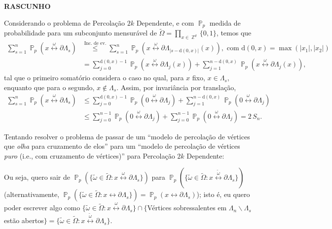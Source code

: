 \documentclass[12pt, a4paper]{article}
\DeclareMathOperator{\PX}{\mathbb{P}} %
\DeclareMathOperator{\ZX}{\mathbb{Z}} %
\theoremstyle{definition} %
\begin{document}
	\begin{center}
		\LARGE
		\textbf{RASCUNHO}
	\end{center} 
	
	Considerando o problema de Percolação $2k$ Dependente, e com $\PX_p$ medida de probabilidade para um subconjunto mensurável de $\tilde{\Omega} = \prod_{x \in \ZX^d}\{0, 1\}$, temos que
	\begin{align*}
	\sum_{s = 1}^{n} \PX_p(x \overset{\omega}{\leftrightarrow} \partial\Lambda_s) &\overset{\text{Inc. de ev.}}{\leq} \sum_{s = 1}^{n} \PX_p(x \overset{\omega}{\leftrightarrow} \partial\Lambda_{|s - \text{d}(0, x)|}(x)), \text{ com } \text{d}(0, x) = \max(|x_1|, |x_2|) \\
	&= \sum_{j = 0}^{\text{d}(0, x) - 1} \PX_p(x \overset{\omega}{\leftrightarrow} \partial\Lambda_j(x)) + \sum_{j = 1}^{n - \text{d}(0, x)} \PX_p(x \overset{\omega}{\leftrightarrow} \partial\Lambda_j(x)),
	\end{align*}
	tal que o primeiro somatório considera o caso no qual, para $x$ fixo, $x \in \Lambda_s$, enquanto que para o segundo, $x \not\in \Lambda_s$. Assim, por invariância por translação,
	\begin{align*}
		\sum_{s = 1}^{n} \PX_p(x \overset{\omega}{\leftrightarrow} \partial\Lambda_s) &\leq \sum_{j = 0}^{\text{d}(0, x) - 1} \PX_p(0 \overset{\omega}{\leftrightarrow} \partial\Lambda_j) + \sum_{j = 1}^{n - \text{d}(0, x)} \PX_p(0 \overset{\omega}{\leftrightarrow} \partial\Lambda_j) \\
		&\leq \sum_{j = 0}^{n - 1} \PX_p(0 \overset{\omega}{\leftrightarrow} \partial\Lambda_j) + \sum_{j = 0}^{n - 1} \PX_p(0 \overset{\omega}{\leftrightarrow} \partial\Lambda_j) = 2 \, S_n.
	\end{align*}
	
	\vspace{24pt}
	Tentando resolver o problema de passar de um ``modelo de percolação de vértices que \textit{olha} para cruzamento de elos'' para um ``modelo de percolação de vértices \textit{puro} (i.e., com cruzamento de vértices)'' para Percolação $2k$ Dependente:
	
	Ou seja, quero sair de $\PX_p(\{\tilde{\omega} \in \tilde{\Omega} : x \overset{\omega}{\leftrightarrow} \partial\Lambda_s\})$ para $\PX_p(\{\tilde{\omega} \in \tilde{\Omega} : x \overset{\tilde{\omega}}{\leftrightarrow} \partial\Lambda_s\})$ (alternativamente, $\PX_p(\{\tilde{\omega} \in \tilde{\Omega} : x \leftrightarrow \partial\Lambda_s\}) = \PX_p(x \leftrightarrow \partial\Lambda_s)$); isto é, eu quero poder escrever algo como $\{\tilde{\omega} \in \tilde{\Omega} : x \overset{\omega}{\leftrightarrow} \partial\Lambda_s\} \cap \{$Vértices sobressalentes em $\Lambda_n \backslash \Lambda_s$ estão abertos$\} = \{\tilde{\omega} \in \tilde{\Omega} : x \overset{\tilde{\omega}}{\leftrightarrow} \partial\Lambda_s\}$.
	
\end{document}
